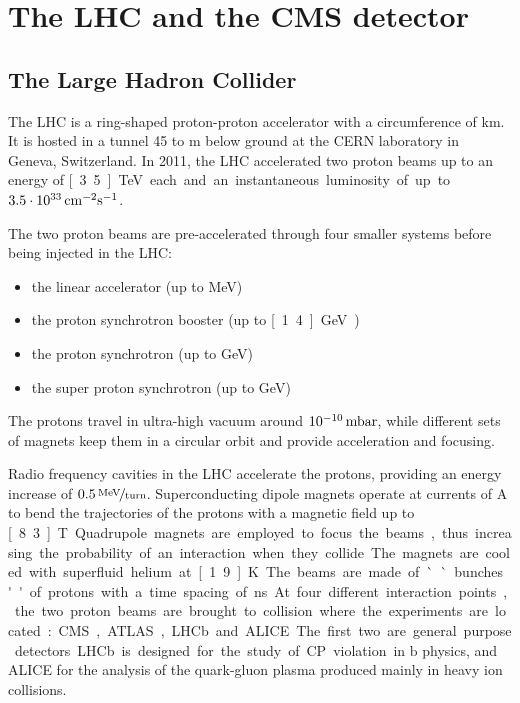 \chapter{The LHC and the CMS detector}
\section{The Large Hadron Collider}
The LHC is a ring-shaped proton-proton accelerator with a circumference of
\unit[27]{km}. It is hosted in a tunnel 45 to \unit[170]{m} below ground at
the CERN laboratory in Geneva, Switzerland. In 2011, the LHC accelerated two
proton beams up to an energy of \unit[3.5]{TeV} each and an instantaneous
luminosity of up to $\unit[3.5\cdot 10^{33}]{cm^{-2}s^{-1}}$.

The two proton beams are pre-accelerated through four smaller systems before
being injected in the LHC:
\begin{itemize}
    \item the linear accelerator (up to \unit[50]{MeV})
    \item the proton synchrotron booster (up to \unit[1.4]{GeV})
    \item the proton synchrotron (up to \unit[26]{GeV})
    \item the super proton synchrotron (up to \unit[450]{GeV})
\end{itemize}

The protons travel in ultra-high vacuum around
$\unit[10^{-10}]{mbar}$, while different sets of magnets keep them in a
circular orbit and provide acceleration and focusing.

Radio frequency cavities in the LHC accelerate the protons, providing an energy
increase of $\unitfrac[0.5]{MeV}{turn}$.
Superconducting dipole magnets operate at currents of \unit[11850]{A} to bend the trajectories
of the protons with a magnetic field up to \unit[8.3]{T}.
Quadrupole magnets are employed to focus the beams, thus increasing the
probability of an interaction when they collide.
The magnets are cooled with superfluid helium at \unit[1.9]{K}.
The beams are made of ``bunches'' of protons with a time spacing of
\unit[75]{ns}.

At four different interaction points, the two proton beams are brought to
collision where the experiments are located: CMS, ATLAS, LHCb and ALICE.
The first two are general purpose detectors. LHCb is designed for the study
of CP violation in $\mathrm{b}$ physics, and ALICE for the analysis of the
quark-gluon plasma produced mainly in heavy ion collisions.

